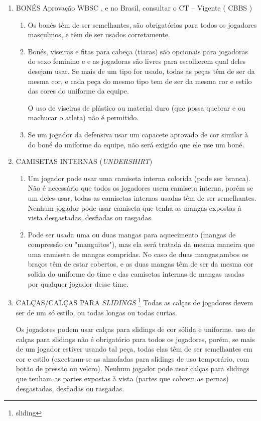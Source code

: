 \begin{enumerate}[label=(\alph*)]
	\item BONÉS  Aprovação WBSC , e no Brasil, consultar o CT -- Vigente ( CBBS )

   \begin{enumerate}[label=\roman*.]
 	\item Os bonés têm de ser semelhantes, são obrigatórios para todos os jogadores masculinos, e têm de ser usados corretamente.

\item  Bonés, viseiras e fitas para cabeça (tiaras) são opcionais para jogadoras do sexo feminino e e as jogadoras são livres para escolherem qual deles desejam usar. Se mais de um tipo for usado, todas as peças têm de ser da mesma cor, e cada peça do mesmo tipo tem de ser da mesma cor e estilo das cores do uniforme da equipe.

 O uso de viseiras de plástico ou material duro (que possa quebrar e ou machucar o atleta) não é permitido.

\item  Se um jogador da defensiva usar um capacete aprovado de cor similar à do boné do uniforme da equipe, não será exigido que ele use um boné.
\end{enumerate}
\item  CAMISETAS INTERNAS (\textit{UNDERSHIRT})
   \begin{enumerate}[label=\roman*.]
 	\item Um jogador pode usar uma camiseta interna colorida (pode ser branca). Não é necessário que todos os jogadores usem camiseta interna, porém se um deles usar, todas as camisetas internas usadas têm de ser semelhantes. Nenhum jogador pode usar camiseta que tenha as mangas expostas à vista desgastadas, desfiadas ou rasgadas.
	\item  Pode ser usada uma ou duas mangas para aquecimento (mangas de compressão ou "manguitos"), mas ela será tratada da mesma maneira que uma camiseta de mangas compridas. No caso de duas mangas,ambos os braços têm de estar cobertos, e as duas mangas têm de ser da mesma cor solida do uniforme do time e das camisetas internas de mangas usadas por qualquer jogador desse time.
\end{enumerate}
\item  CALÇAS/CALÇAS PARA \textit{SLIDINGS} \footnote{\gls{sliding}} Todas as calças de jogadores devem ser de um só estilo, ou todas longas ou todas curtas.

 Os jogadores podem usar calças para \glspl{sliding} de cor sólida e uniforme. uso de calças para \glspl{sliding} não é obrigatório para todos os jogadores, porém, se mais de um jogador estiver usando tal peça, todas elas têm de ser semelhantes em cor e estilo (excetuam-se as almofadas para \glspl{sliding} de uso temporário, com botão de pressão ou velcro). Nenhum jogador pode usar calças para \glspl{sliding} que tenham as partes expostas à vista (partes que cobrem as  pernas) desgastadas, desfiadas ou rasgadas.


\end{enumerate}
